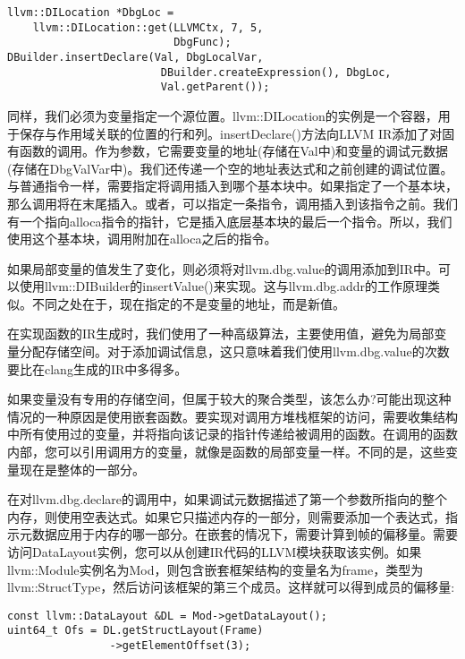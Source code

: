 \begin{lstlisting}[caption={}]
llvm::DILocation *DbgLoc =
	llvm::DILocation::get(LLVMCtx, 7, 5, 
					      DbgFunc);
DBuilder.insertDeclare(Val, DbgLocalVar,
						DBuilder.createExpression(), DbgLoc,
						Val.getParent());
\end{lstlisting}

同样，我们必须为变量指定一个源位置。llvm::DILocation的实例是一个容器，用于保存与作用域关联的位置的行和列。insertDeclare()方法向LLVM IR添加了对固有函数的调用。作为参数，它需要变量的地址(存储在Val中)和变量的调试元数据(存储在DbgValVar中)。我们还传递一个空的地址表达式和之前创建的调试位置。与普通指令一样，需要指定将调用插入到哪个基本块中。如果指定了一个基本块，那么调用将在末尾插入。或者，可以指定一条指令，调用插入到该指令之前。我们有一个指向alloca指令的指针，它是插入底层基本块的最后一个指令。所以，我们使用这个基本块，调用附加在alloca之后的指令。\par

如果局部变量的值发生了变化，则必须将对llvm.dbg.value的调用添加到IR中。可以使用llvm::DIBuilder的insertValue()来实现。这与llvm.dbg.addr的工作原理类似。不同之处在于，现在指定的不是变量的地址，而是新值。\par

在实现函数的IR生成时，我们使用了一种高级算法，主要使用值，避免为局部变量分配存储空间。对于添加调试信息，这只意味着我们使用llvm.dbg.value的次数要比在clang生成的IR中多得多。\par

如果变量没有专用的存储空间，但属于较大的聚合类型，该怎么办?可能出现这种情况的一种原因是使用嵌套函数。要实现对调用方堆栈框架的访问，需要收集结构中所有使用过的变量，并将指向该记录的指针传递给被调用的函数。在调用的函数内部，您可以引用调用方的变量，就像是函数的局部变量一样。不同的是，这些变量现在是整体的一部分。\par

在对llvm.dbg.declare的调用中，如果调试元数据描述了第一个参数所指向的整个内存，则使用空表达式。如果它只描述内存的一部分，则需要添加一个表达式，指示元数据应用于内存的哪一部分。在嵌套的情况下，需要计算到帧的偏移量。需要访问DataLayout实例，您可以从创建IR代码的LLVM模块获取该实例。如果llvm::Module实例名为Mod，则包含嵌套框架结构的变量名为frame，类型为llvm::StructType，然后访问该框架的第三个成员。这样就可以得到成员的偏移量:\par

\begin{lstlisting}[caption={}]
const llvm::DataLayout &DL = Mod->getDataLayout();
uint64_t Ofs = DL.getStructLayout(Frame)
				->getElementOffset(3);
\end{lstlisting}

